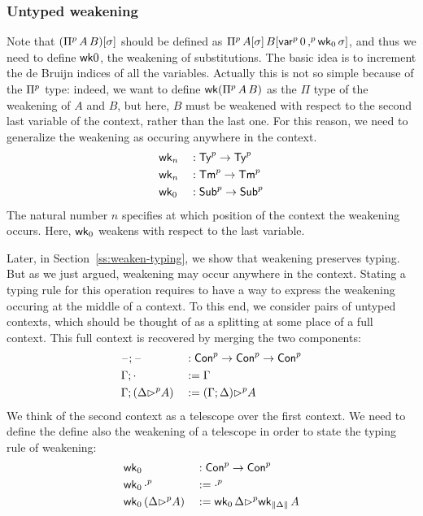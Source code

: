 \subsubsection{Untyped weakening}




Note that $({\Pi}^p \,A\,B)[\sigma]$ should be defined as ${\Pi}^p
\,A[\sigma]\,B[{\mathsf{var}}^p\, 0 \,{,}^p\, \mathsf{wk}_0\,\sigma]$, and thus we need to define
$\mathsf{wk}0$, the weakening of substitutions.
The basic idea is to increment the de Bruijn indices of all the variables.
Actually this is not so simple because of the ${\Pi}^p$ type:
indeed, we want to define $\mathsf{wk}({\Pi}^p\,A\,B)$ as the $\Pi$ type of the weakening
of $A$ and $B$, but here, $B$ must be weakened with respect to the second last
variable of the context, rather than the last one.
For this reason, we need to generalize the weakening as occuring anywhere in the context.
\begin{alignat*}{5}
  & \mathsf{wk}_n && :  {\mathsf{Ty}}^p\rightarrow{\mathsf{Ty}}^p \\
  & \mathsf{wk}_n && :  {\mathsf{Tm}}^p\rightarrow{\mathsf{Tm}}^p \\
  & \mathsf{wk}_0 && : {\mathsf{Sub}}^p\rightarrow {\mathsf{Sub}}^p
  \end{alignat*}
  The natural number $n$ specifies at which position of the context the
  weakening occurs.
  Here, $\mathsf{wk}_0$ weakens with respect to the last variable.

  Later, in Section~\ref{ss:weaken-typing}, we show that weakening preserves typing.
  But as we just argued, weakening may occur anywhere in the context.
Stating a typing rule for this operation requires to have a way to express
the weakening occuring at the middle of a context.
To this end, we consider pairs of untyped contexts, which should be thought
of as a splitting at some place of a full context.
This full context is recovered by merging the two components:
\begin{alignat*}{5}
  & \mathord{\hspace{1pt}\text{--}\hspace{1pt}} ; \mathord{\hspace{1pt}\text{--}\hspace{1pt}} && :  {\mathsf{Con}}^p\rightarrow{\mathsf{Con}}^p\rightarrow{\mathsf{Con}}^p \\
  & \Gamma ; \cdot && :=  \Gamma \\
  & \Gamma ; (\Delta {\rhd}^p A) && :=  (\Gamma ; \Delta){\rhd}^p A
\end{alignat*}
We think of the second context as a telescope over the first context.
We need to define the define also the weakening of a telescope in order to
state the typing rule of weakening:
\begin{alignat*}{5}
  & \mathsf{wk}_0 && : {\mathsf{Con}}^p\rightarrow {\mathsf{Con}}^p
  \\
  & \mathsf{wk}_0\,{\cdot}^p && := {\cdot}^p
  \\
  & \mathsf{wk}_0\,(\Delta {\rhd}^p A) && := \mathsf{wk}_0\,\Delta {\rhd}^p \mathsf{wk}_{\| \Delta \|}\,A
  \end{alignat*}
